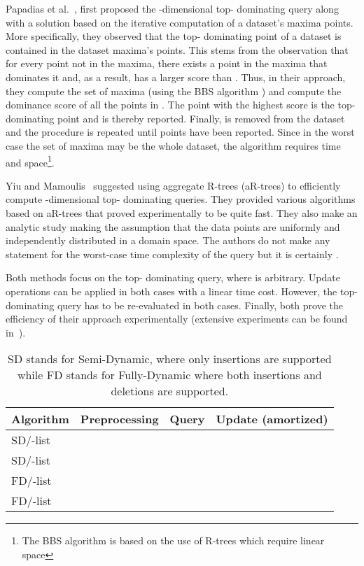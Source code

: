 \documentclass{llncs}
\begin{document}
Papadias et al.~\cite{Papadias05}, first proposed the -dimensional top- dominating query along with a solution based on the iterative computation of a dataset's maxima points. More specifically, they observed that the top- dominating point of a dataset is contained in the dataset maxima's points. This stems from the observation that for every point  not in the maxima, there exists a point  in the maxima that dominates it and, as a result,  has a larger score than . Thus, in their approach, they compute the set of maxima  (using the BBS algorithm \cite{Papadias05}) and compute the dominance score of all the points in . The point  with the highest score is the top- dominating point and is thereby reported. Finally,  is removed from the dataset and the procedure is repeated until  points have been reported. Since in the worst case the set of maxima may be the whole dataset, the algorithm requires  time and  space\footnote{The BBS algorithm is based on the use of R-trees which require linear space}.


Yiu and Mamoulis~\cite{YiuM09} suggested using aggregate R-trees (aR-trees) to efficiently compute -dimensional top- dominating queries. They provided various algorithms based on aR-trees that proved experimentally to be quite fast. They also make an analytic study making the assumption that the data points are uniformly and independently distributed in a domain space. The authors do not make any statement for the worst-case time complexity of the query but it is certainly .

 Both methods \cite{Papadias05,YiuM09} focus on the top- dominating query, where  is arbitrary. Update operations can be applied in both cases with a linear time cost. However, the top- dominating query has to be re-evaluated in both cases. Finally, both prove the efficiency of their approach experimentally (extensive experiments can be found in~\cite{YiuM09}).
\vspace{-0.5cm}
\begin{table}\centering\footnotesize
\caption{SD stands for Semi-Dynamic, where only insertions are supported while FD stands for Fully-Dynamic where both insertions and deletions are supported. \vspace{-0.3cm}}\label{table:OurResults}
\begin{tabular}{l|c|c|c}
\hline
Algorithm & Preprocessing & Query & Update (amortized)\\
\hline
SD/-list &  &  &  \\
SD/-list &  &  &  \\
FD/-list &  &  &  \\
FD/-list &  &  &  \\
\hline
\end{tabular}
\end{table}
\end{document}
